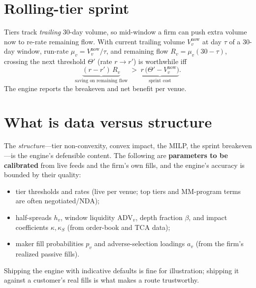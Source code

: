 \documentclass[11pt]{article}
\begin{document}
\section{Rolling-tier sprint}
Tiers track \emph{trailing} 30-day volume, so mid-window a firm can push extra
volume now to re-rate remaining flow. With current trailing volume $V^{\text{now}}_v$
at day $\tau$ of a 30-day window, run-rate $\mu_v=V^{\text{now}}_v/\tau$, and
remaining flow $R_v=\mu_v(30-\tau)$, crossing the next threshold
$\Theta'$ (rate $r\to r'$) is worthwhile iff
\begin{equation}
\underbrace{(r-r')\,R_v}_{\text{saving on remaining flow}}
\;>\;
\underbrace{r\,\bigl(\Theta'-V^{\text{now}}_v\bigr)}_{\text{sprint cost}} .
\end{equation}
The engine reports the breakeven and net benefit per venue.

\section{What is data versus structure}
The \emph{structure}---tier non-convexity, convex impact, the MILP, the
sprint breakeven---is the engine's defensible content. The following are
\textbf{parameters to be calibrated} from live feeds and the firm's own fills,
and the engine's accuracy is bounded by their quality:
\begin{itemize}[nosep]
\item tier thresholds and rates (live per venue; top tiers and MM-program terms
are often negotiated/NDA);
\item half-spreads $h_v$, window liquidity $\mathrm{ADV}_v$, depth fraction
$\beta$, and impact coefficients $\kappa,\kappa_S$ (from order-book and TCA
data);
\item maker fill probabilities $p_v$ and adverse-selection loadings $a_v$ (from
the firm's realized passive fills).
\end{itemize}
Shipping the engine with indicative defaults is fine for illustration; shipping
it against a customer's real fills is what makes a route trustworthy.
\end{document}
